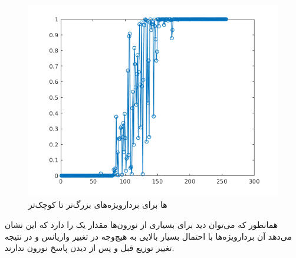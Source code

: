 \documentclass[12pt,onecolumn,a4paper,fleqn]{article}
\begin{document}
 \begin{figure}[ht]
 	\centering
 	\includegraphics[width=0.6\linewidth]{photos/p-value-eigenvectors.png}
 	\caption{
 	ها برای بردار‌ویژه‌های بزرگ‌تر تا کوچک‌تر	
 }
 \end{figure}	     

همانطور که می‌توان دید برای بسیاری از نورون‌ها  مقدار یک را دارد که این نشان می‌دهد آن بردارویژه‌ها با احتمال بسیار بالایی به هیچ‌وجه در تغییر واریانس و در نتیجه تغییر توزیع قبل و پس از دیدن پاسخ نورون ندارند.
\end{document}
